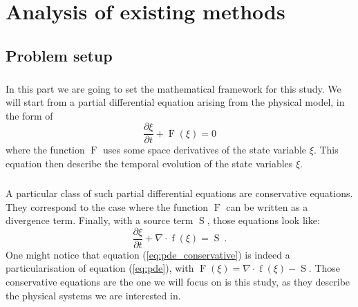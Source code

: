 \chapter{Analysis of existing methods}

  \section{Problem setup}

    \paragraph{}
    In this part we are going to set the mathematical framework for this study.
    We will start from a partial differential equation arising from the physical model, in the form of
    \begin{equation}\label{eq:pde}
      \frac{\partial \xi}{\partial t} + \operatorname{F}\left(\xi\right) = 0
    \end{equation}
    where the function $\operatorname{F}$ uses some space derivatives of the state variable $\xi$.
    This equation then describe the temporal evolution of the state variables $\xi$.

    \paragraph{}
    A particular class of such partial differential equations are conservative equations.
    They correspond to the case where the function $\operatorname{F}$ can be written as a divergence term.
    Finally, with a source term $\operatorname{S}$, those equations look like:
    \begin{equation}\label{eq:pde_conservative}
      \frac{\partial \xi}{\partial t} + \nabla \cdot \operatorname{f}\left(\xi\right) = \operatorname{S}\ .
    \end{equation}
    One might notice that equation (\ref{eq:pde_conservative}) is indeed a particularisation of equation (\ref{eq:pde}), with $\operatorname{F}\left(\xi\right) = \nabla\cdot \operatorname{f}\left(\xi\right) - \operatorname{S}$.
    Those conservative equations are the one we will focus on is this study, as they describe the physical systems we are interested in.

